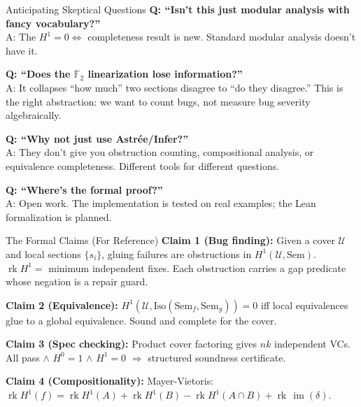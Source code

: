 \documentclass[aspectratio=169,10pt]{beamer}
\newcommand{\Uscr}{\mathcal{U}}
\newcommand{\Iso}{\mathrm{Iso}}
\newcommand{\Sem}{\mathrm{Sem}}
\newcommand{\im}{\operatorname{im}}
\newcommand{\rk}{\operatorname{rk}}
\begin{document}
\begin{frame}{Anticipating Skeptical Questions}
\textbf{Q: ``Isn't this just modular analysis with fancy vocabulary?''}\\
A: The $H^1 = 0 \Leftrightarrow$ completeness result is new. Standard modular analysis doesn't have it.

\vspace{0.3em}
\textbf{Q: ``Does the $\mathbb{F}_2$ linearization lose information?''}\\
A: It collapses ``how much'' two sections disagree to ``do they disagree.'' This is the right abstraction: we want to count bugs, not measure bug severity algebraically.

\vspace{0.3em}
\textbf{Q: ``Why not just use Astr\'ee/Infer?''}\\
A: They don't give you obstruction counting, compositional analysis, or equivalence completeness. Different tools for different questions.

\vspace{0.3em}
\textbf{Q: ``Where's the formal proof?''}\\
A: Open work. The implementation is tested on real examples; the Lean formalization is planned.
\end{frame}

\begin{frame}{The Formal Claims (For Reference)}
\textbf{Claim 1 (Bug finding):}
Given a cover $\Uscr$ and local sections $\{s_i\}$, gluing failures are obstructions in $H^1(\Uscr, \Sem)$.
$\rk H^1 =$ minimum independent fixes. Each obstruction carries a gap predicate whose negation is a repair guard.

\vspace{0.2em}
\textbf{Claim 2 (Equivalence):}
$H^1(\Uscr, \Iso(\Sem_f, \Sem_g)) = 0$ iff local equivalences glue to a global equivalence. Sound and complete for the cover.

\vspace{0.2em}
\textbf{Claim 3 (Spec checking):}
Product cover factoring gives $nk$ independent VCs. All pass $\wedge$ $H^0 = 1$ $\wedge$ $H^1 = 0$ $\Rightarrow$ structured soundness certificate.

\vspace{0.2em}
\textbf{Claim 4 (Compositionality):}
Mayer-Vietoris: $\rk H^1(f) = \rk H^1(A) + \rk H^1(B) - \rk H^1(A \cap B) + \rk\,\im(\delta)$.
\end{frame}
\end{document}
